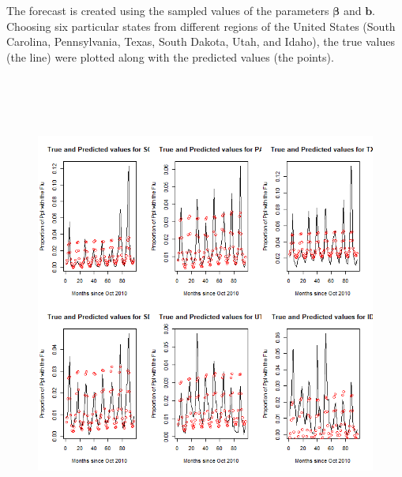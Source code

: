 \documentclass[12pt, onesided]{article}
\begin{document}
\begin{flushleft}
The forecast is created using the sampled values of the parameters $\boldsymbol{\beta}$ and $\boldsymbol{b}$. Choosing six particular states from different regions of the United States (South Carolina, Pennsylvania, Texas, South Dakota, Utah, and Idaho), the true values (the line) were plotted along with the predicted values (the points).
\begin{figure}[h!]
\centering
\includegraphics[width=5in, height=6in]{Project1_predict_vs_true}
\end{figure}


\end{flushleft}
\end{document}
